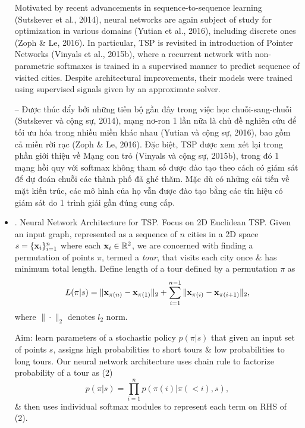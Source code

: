 \documentclass{article}
\begin{document}
\begin{itemize}
    Motivated by recent advancements in sequence-to-sequence learning (Sutskever et al., 2014), neural networks are again subject of study for optimization in various domains (Yutian et al., 2016), including discrete ones (Zoph \& Le, 2016). In particular, TSP is revisited in introduction of Pointer Networks (Vinyals et al., 2015b), where a recurrent network with non-parametric softmaxes is trained in a supervised manner to predict sequence of visited cities. Despite architectural improvements, their models were trained using supervised signals given by an approximate solver.
    
    -- Được thúc đẩy bởi những tiến bộ gần đây trong việc học chuỗi-sang-chuỗi (Sutskever và cộng sự, 2014), mạng nơ-ron 1 lần nữa là chủ đề nghiên cứu để tối ưu hóa trong nhiều miền khác nhau (Yutian và cộng sự, 2016), bao gồm cả miền rời rạc (Zoph \& Le, 2016). Đặc biệt, TSP được xem xét lại trong phần giới thiệu về Mạng con trỏ (Vinyals và cộng sự, 2015b), trong đó 1 mạng hồi quy với softmax không tham số được đào tạo theo cách có giám sát để dự đoán chuỗi các thành phố đã ghé thăm. Mặc dù có những cải tiến về mặt kiến trúc, các mô hình của họ vẫn được đào tạo bằng các tín hiệu có giám sát do 1 trình giải gần đúng cung cấp.
    \item {. Neural Network Architecture for TSP.} Focus on 2D Euclidean TSP. Given an input graph, represented as a sequence of $n$ cities in a 2D space $s = \{{\bf x}_i\}_{i=1}^n$ where each ${\bf x}_i\in\mathbb{R}^2$, we are concerned with finding a permutation of points $\pi$, termed a {\it tour}, that visits each city once \& has minimum total length. Define length of a tour defined by a permutation $\pi$ as
    \begin{equation*}
        L(\pi|s) = \|{\bf x}_{\pi(n)} - {\bf x}_{\pi(1)}\|_2 + \sum_{i=1}^{n-1} \|{\bf x}_{\pi(i)} - {\bf x}_{\pi(i+1)}\|_2,
    \end{equation*}
    where $\|\cdot\|_2$ denotes $l_2$ norm.
    
    Aim: learn parameters of a stochastic policy $p(\pi|s)$ that given an input set of points $s$, assigns high probabilities to short tours \& low probabilities to long tours. Our neural network architecture uses chain rule to factorize probability of a tour as (2)
    \begin{equation*}
        p(\pi|s) = \prod_{i=1}^n p(\pi(i)|\pi(< i),s),
    \end{equation*}
    \& then uses individual softmax modules to represent each term on RHS of (2).
    

\end{itemize}
\end{document}

